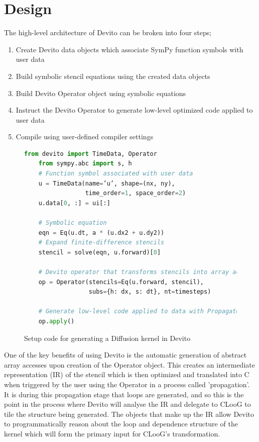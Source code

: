 \documentclass[a4paper,12pt,twoside]{report}
\begin{document}
\section{Design}
The high-level architecture of Devito can be broken into four steps;
\begin{enumerate}
    \item Create Devito data objects which associate SymPy function symbols with user data
    \item Build symbolic stencil equations using the created data objects
    \item Build Devito Operator object using symbolic equations
    \item Instruct the Devito Operator to generate low-level optimized code applied to user data
    \item Compile using user-defined compiler settings
\end{enumerate}

\begin{figure}[h]
    \begin{lstlisting}[language=Python]
    from devito import TimeData, Operator
    from sympy.abc import s, h
    # Function symbol associated with user data
    u = TimeData(name=’u’, shape=(nx, ny),
                 time_order=1, space_order=2)
    u.data[0, :] = ui[:]

    # Symbolic equation
    eqn = Eq(u.dt, a * (u.dx2 + u.dy2))
    # Expand finite-difference stencils
    stencil = solve(eqn, u.forward)[0]

    # Devito operator that transforms stencils into array accesses
    op = Operator(stencils=Eq(u.forward, stencil),
                  subs={h: dx, s: dt}, nt=timesteps)

    # Generate low-level code applied to data with Propagator
    op.apply()
    \end{lstlisting}
    \caption{ Setup code for generating a Diffusion kernel in Devito}
    \label{fig:diffusion_devito}
\end{figure}

One of the key benefits of using Devito is the automatic generation of abstract array accesses upon creation of the Operator object. This 
creates an intermediate representation (IR) of the stencil which is then optimized and translated into C when triggered by the user using the Operator
in a process called 'propagation'. It is during this propagation stage that loops are generated, and so this is the point in the process where
Devito will analyse the IR and delegate to CLooG to tile the structure being generated. The objects that make up the IR allow
Devito to programmatically reason about the loop and dependence structure of the kernel which will form the primary input for CLooG's transformation.
\end{document}

